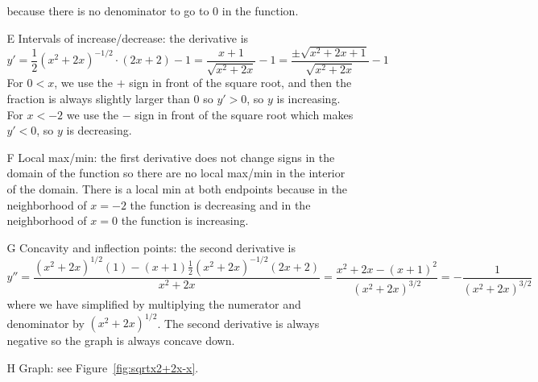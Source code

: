 \documentclass{article}
\begin{document}
\begin{enumerate}
\begin{enumerate}
\begin{itemize}
      because there is no denominator to go to $0$ in the function.
    \item[E] Intervals of increase/decrease: the derivative is
      \begin{displaymath}
        y'=\frac{1}{2}(x^2+2x)^{-1/2}\cdot (2x+2) - 1
        = \frac{x+1}{\sqrt{x^2+2x}} - 1
        = \frac{\pm\sqrt{x^2+2x+1}}{\sqrt{x^2+2x}} - 1
      \end{displaymath}
      For $0<x$, we use the $+$ sign in front of the square root, and
      then the fraction is always slightly larger than $0$ so $y'>0$,
      so $y$ is increasing.  For $x<-2$ we use the $-$ sign in front
      of the square root which makes $y'<0$, so $y$ is decreasing.
    \item[F] Local max/min: the first derivative does not change signs
      in the domain of the function so there are no local max/min in
      the interior of the domain.  There is a local min at both
      endpoints because in the neighborhood of $x=-2$ the function is
      decreasing and in the neighborhood of $x=0$ the function is
      increasing.
    \item[G] Concavity and inflection points: the second derivative is
      \begin{displaymath}
        y''=\frac{(x^2+2x)^{1/2}(1)- (x+1)\frac{1}{2}(x^2+2x)^{-1/2}(2x+2)}
        {x^2+2x}
        = \frac{x^2+2x-(x+1)^2}{(x^2+2x)^{3/2}}
        = -\frac{1}{(x^2+2x)^{3/2}}
      \end{displaymath}
      where we have simplified by multiplying the numerator and
      denominator by $(x^2+2x)^{1/2}$.  The second derivative is
      always negative so the graph is always concave down.
    \item[H] Graph: see Figure~\ref{fig:sqrtx2+2x-x}.
    \end{itemize}
    \begin{figure}[htbp]
      \centering
\end{figure}
\end{enumerate}
\end{enumerate}
\end{document}
